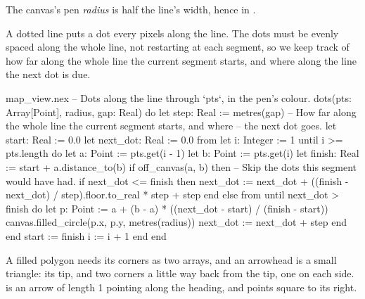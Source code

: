 The canvas's pen \emph{radius} is half the line's width, hence
 in .

A dotted line puts a dot every  pixels along the line. The dots
must be evenly spaced along the whole line, not restarting at each segment,
so we keep track of how far along the whole line the current segment
starts, and where along the line the next dot is due.

\begin{continued}{map_view.nex}
  -- Dots along the line through `pts`, in the pen's colour.
  dots(pts: Array[Point], radius, gap: Real) do
    let step: Real := metres(gap)
    -- How far along the whole line the current segment starts, and where
    -- the next dot goes.
    let start: Real := 0.0
    let next_dot: Real := 0.0
    from
      let i: Integer := 1
    until
      i >= pts.length
    do
      let a: Point := pts.get(i - 1)
      let b: Point := pts.get(i)
      let finish: Real := start + a.distance_to(b)
      if off_canvas(a, b) then
        -- Skip the dots this segment would have had.
        if next_dot <= finish then
          next_dot := next_dot + ((finish - next_dot) / step).floor.to_real * step + step
        end
      else
        from
        until
          next_dot > finish
        do
          let p: Point := a + (b - a) * ((next_dot - start) / (finish - start))
          canvas.filled_circle(p.x, p.y, metres(radius))
          next_dot := next_dot + step
        end
      end
      start := finish
      i := i + 1
    end
  end
\end{continued}

A filled polygon needs its corners as two arrays, and an arrowhead is a
small triangle: its tip, and two corners a little way back from the tip,
one on each side.  is an arrow of length 1
pointing along the heading, and  points
square to its right.

